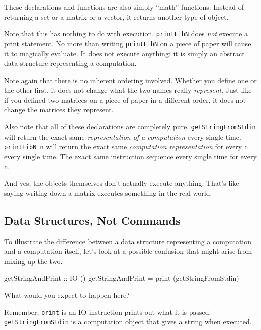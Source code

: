 \documentclass[]{article}
\newenvironment{Shaded}{}{}
\newcommand{\DataTypeTok}[1]{\textcolor[rgb]{0.56,0.13,0.00}{{#1}}}
\newcommand{\OtherTok}[1]{\textcolor[rgb]{0.00,0.44,0.13}{{#1}}}
\newcommand{\FunctionTok}[1]{\textcolor[rgb]{0.02,0.16,0.49}{{#1}}}
\newcommand{\NormalTok}[1]{{#1}}
\begin{document}
These declarations and functions are also simply ``math'' functions. Instead of returning a set or a
matrix or a vector, it returns another type of object.

Note that this has nothing to do with execution. \texttt{printFibN} does \emph{not} execute a print
statement. No more than writing \texttt{printFibN} on a piece of paper will cause it to magically
evaluate. It does not execute anything: it is simply an abstract data structure representing a
computation.

Note again that there is no inherent ordering involved. Whether you define one or the other first,
it does not change what the two names really \emph{represent}. Just like if you defined two matrices
on a piece of paper in a different order, it does not change the matrices they represent.

Also note that all of these declarations are completely pure. \texttt{getStringFromStdin} will
return the exact same \emph{representation of a computation} every single time.
\texttt{printFibN\ n} will return the exact same \emph{computation representation} for every
\texttt{n} every single time. The exact same instruction sequence every single time for every
\texttt{n}.

And yes, the objects themselves don't actually execute anything. That's like saying writing down a
matrix executes something in the real world.

\subsection{Data Structures, Not Commands}\label{data-structures-not-commands}

To illustrate the difference between a data structure representing a computation and a computation
itself, let's look at a possible confusion that might arise from mixing up the two.

\begin{Shaded}
\begin{Highlighting}[]
\OtherTok{getStringAndPrint ::} \DataTypeTok{IO} \NormalTok{()}
\NormalTok{getStringAndPrint }\FunctionTok{=} \NormalTok{print (getStringFromStdin)}
\end{Highlighting}
\end{Shaded}

What would you expect to happen here?

Remember, \texttt{print} is an IO instruction prints out what it is passed.
\texttt{getStringFromStdin} is a computation object that gives a string when executed.
\end{document}
